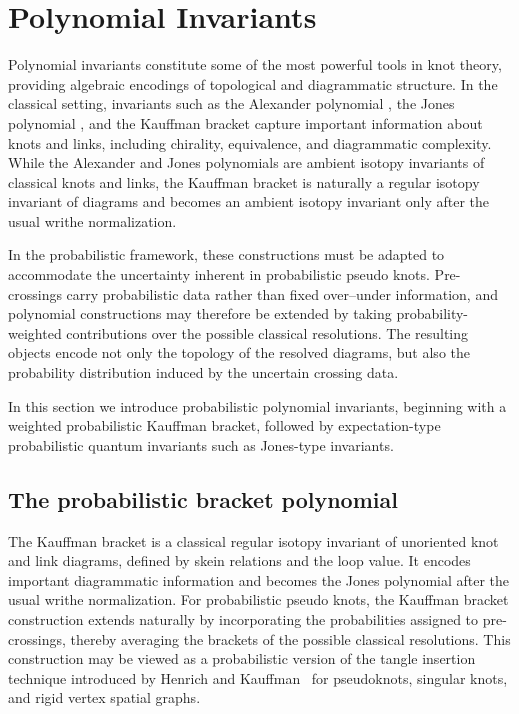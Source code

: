 \documentclass[a4paper, reqno, 12pt]{amsart}
\theoremstyle{plain}
\theoremstyle{definition}
\begin{document}



\section{Polynomial Invariants}\label{sec:polyinv}

Polynomial invariants constitute some of the most powerful tools in knot theory, providing algebraic encodings of topological and diagrammatic structure. In the classical setting, invariants such as the Alexander polynomial \cite{Alexander}, the Jones polynomial \cite{Jones}, and the Kauffman bracket \cites{Kauffman,LK,LK1} capture important information about knots and links, including chirality, equivalence, and diagrammatic complexity. While the Alexander and Jones polynomials are ambient isotopy invariants of classical knots and links, the Kauffman bracket is naturally a regular isotopy invariant of diagrams and becomes an ambient isotopy invariant only after the usual writhe normalization.

In the probabilistic framework, these constructions must be adapted to accommodate the uncertainty inherent in probabilistic pseudo knots. Pre-crossings carry probabilistic data rather than fixed over--under information, and polynomial constructions may therefore be extended by taking probability-weighted contributions over the possible classical resolutions. The resulting objects encode not only the topology of the resolved diagrams, but also the probability distribution induced by the uncertain crossing data.

In this section we introduce probabilistic polynomial invariants, beginning with a weighted probabilistic Kauffman bracket, followed by expectation-type probabilistic quantum invariants such as Jones-type invariants.




\subsection{The probabilistic bracket polynomial}

The Kauffman bracket is a classical regular isotopy invariant of unoriented knot and link diagrams, defined by skein relations and the loop value. It encodes important diagrammatic information and becomes the Jones polynomial after the usual writhe normalization. For probabilistic pseudo knots, the Kauffman bracket construction extends naturally by incorporating the probabilities assigned to pre-crossings, thereby averaging the brackets of the possible classical resolutions. This construction may be viewed as a probabilistic version of the tangle insertion technique introduced by Henrich and Kauffman~\cite{HenrichKauffman2017} for pseudoknots, singular knots, and rigid vertex spatial graphs.
\end{document}
